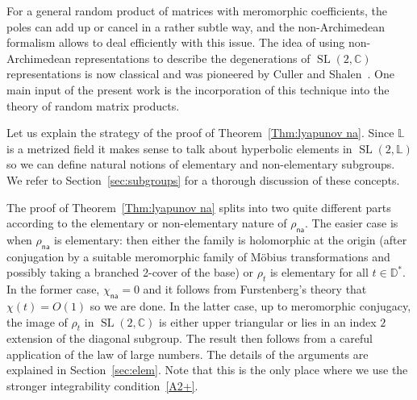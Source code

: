 \documentclass[11pt]{article}
\theoremstyle{definition}
\numberwithin{equation}{section}
\numberwithin{figure}{section}
\numberwithin{table}{section}
\DeclareMathOperator{\SL}{SL}
\newcommand{\D}{\mathbb{D}}
\newcommand{\Laurent}{\mathbb{L}}
\newcommand{\na}{\mathsf{na}}
\newcommand{\SLC}{\SL(2,\mathbb C)}
\begin{document}
For a general random product of matrices with meromorphic coefficients, the poles can add up or cancel in a rather subtle way, and the non-Archimedean formalism allows to deal efficiently with this issue. The idea of using non-Archimedean representations to describe the degenerations of $\SLC$ representations is now classical and was pioneered by Culler and Shalen~\cite{culler-shalen}. One main input of the present work is the incorporation of this technique into the theory of random matrix products.

Let us explain the strategy of the proof of Theorem~\ref{Thm:lyapunov na}. Since $\Laurent$ is a metrized field it makes sense to talk about hyperbolic elements in $\SL(2,\Laurent)$ so we can define natural notions of elementary and non-elementary subgroups. We refer to Section~\ref{sec:subgroups} for a thorough discussion of these concepts.

The proof of Theorem~\ref{Thm:lyapunov na} splits into two quite different parts according to the elementary or non-elementary nature of $\rho_\na$. The easier case is when $\rho_\na$ is elementary: then either the family is holomorphic at the origin (after conjugation by a suitable meromorphic family of M\"obius transformations and possibly taking a branched 2-cover of the base) or $\rho_t$ is elementary for all $t\in \D^*$. In the former case, $\chi_\na = 0$ and it follows from Furstenberg's theory that $\chi(t) = O(1)$ so we are done. In the latter case, up to meromorphic conjugacy, the image of $\rho_t$ in $\SLC$ is either upper triangular or lies in an index $2$ extension of the diagonal subgroup. The result then follows from a careful application of the law of large numbers. The details of the arguments are explained in Section~\ref{sec:elem}. Note that this is the only place where we use the stronger integrability condition~\eqref{A2+}.

\end{document}
